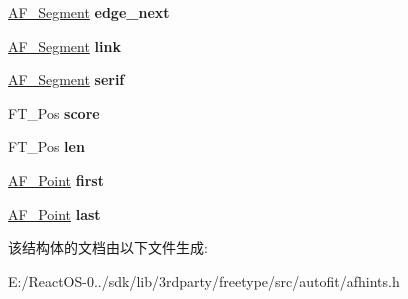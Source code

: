 \begin{DoxyCompactItemize}
\hyperlink{struct_a_f___segment_rec__}{A\+F\+\_\+\+Segment} {\bfseries edge\+\_\+next}
\item 
\mbox{\label{struct_a_f___segment_rec___a7283d71a7e761ea793b9908cf0be7bb9}} 
\hyperlink{struct_a_f___segment_rec__}{A\+F\+\_\+\+Segment} {\bfseries link}
\item 
\mbox{\label{struct_a_f___segment_rec___af0b01b67fb7b94d387ac64ee86f21a15}} 
\hyperlink{struct_a_f___segment_rec__}{A\+F\+\_\+\+Segment} {\bfseries serif}
\item 
\mbox{\label{struct_a_f___segment_rec___ae84e19dcd0a5ef19baa19f1b8d0258ca}} 
F\+T\+\_\+\+Pos {\bfseries score}
\item 
\mbox{\label{struct_a_f___segment_rec___ac75cbe8b7d1f0ca6a8b177e5d09f9982}} 
F\+T\+\_\+\+Pos {\bfseries len}
\item 
\mbox{\label{struct_a_f___segment_rec___a73795f6dab95b41ea461c3ffd926f90c}} 
\hyperlink{struct_a_f___point_rec__}{A\+F\+\_\+\+Point} {\bfseries first}
\item 
\mbox{\label{struct_a_f___segment_rec___a1e2d450a4f1684bee96c39209970f324}} 
\hyperlink{struct_a_f___point_rec__}{A\+F\+\_\+\+Point} {\bfseries last}
\end{DoxyCompactItemize}


该结构体的文档由以下文件生成\+:\begin{DoxyCompactItemize}
\item 
E\+:/\+React\+O\+S-\/0../sdk/lib/3rdparty/freetype/src/autofit/afhints.\+h\end{DoxyCompactItemize}
